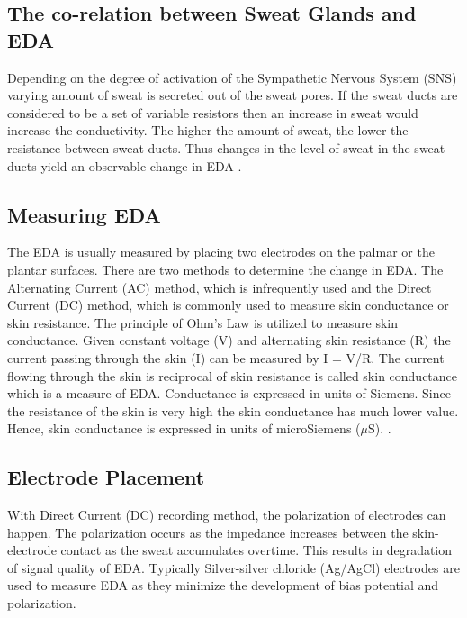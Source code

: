 \subsection{The co-relation between Sweat Glands and EDA}
Depending on the degree of activation of the Sympathetic Nervous System (SNS) varying amount of sweat is secreted out of the sweat pores. If the sweat ducts are considered to be a set of variable resistors then an increase in sweat would increase the conductivity. The higher the amount of sweat, the lower the resistance between sweat ducts. Thus changes in the level of sweat in the sweat ducts yield an observable change in EDA \cite{cacioppo_electrodermal_2016_p_217_243}.

\subsection{Measuring EDA}
The EDA is usually measured by placing two electrodes on the palmar or the plantar surfaces. There are two methods to determine the change in EDA. The Alternating Current (AC) method, which is infrequently used and the Direct Current (DC) method, which is commonly used to measure skin conductance or skin resistance. The principle of Ohm's Law is utilized to measure skin conductance. Given constant voltage (V) and alternating skin resistance (R) the current passing through the skin (I) can be measured by I = V/R. The current flowing through the skin is reciprocal of skin resistance is called skin conductance which is a measure of EDA. Conductance is expressed in units of Siemens. Since the resistance of the skin is very high the skin conductance has much lower value. Hence, skin conductance is expressed in units of microSiemens ($\mu$S). \cite{cacioppo_electrodermal_2016_p_217_243}.

\subsection{Electrode Placement}
\label{sec:electrode_placement}
With Direct Current (DC) recording method, the polarization of electrodes can happen. The polarization occurs as the impedance increases between the skin-electrode contact as the sweat accumulates overtime. This results in degradation of signal quality of EDA. Typically Silver-silver chloride (Ag/AgCl) electrodes are used to measure EDA as they minimize the development of bias potential and polarization. 

